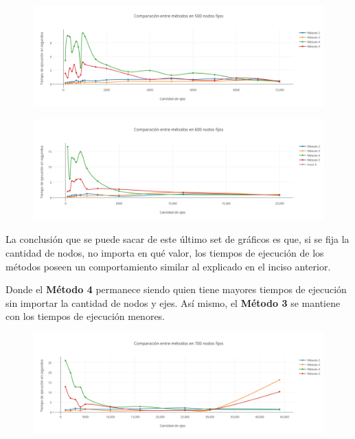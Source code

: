   \begin{figure}[h!]
   \begin{center}
 	\includegraphics[scale=0.55]{imagenes/local/tiempos/500nodos.png}
   \end{center}
 \end{figure}
 
\newpage 
 
   \begin{figure}[h!]
   \begin{center}
 	\includegraphics[scale=0.55]{imagenes/local/tiempos/600nodos.png}
   \end{center}
 \end{figure}

La conclusi\'on que se puede sacar de este \'ultimo set de gr\'aficos es que, si se fija la cantidad de nodos, no importa en qu\'e valor, los tiempos de ejecuci\'on de los m\'etodos poseen un comportamiento similar al explicado en el inciso anterior.

Donde el \textbf{M\'etodo 4} permanece siendo quien tiene mayores tiempos de ejecuci\'on sin importar la cantidad de nodos y ejes. As\'i mismo, el \textbf{M\'etodo 3} se mantiene con los tiempos de ejecuci\'on menores.

  \begin{figure}[h!]
   \begin{center}
 	\includegraphics[scale=0.55]{imagenes/local/tiempos/700nodos.png}
   \end{center}
 \end{figure} 
 
